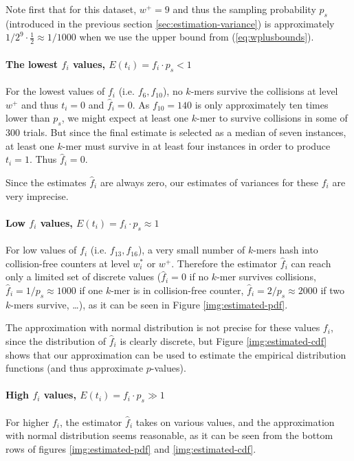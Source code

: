 Note first that for this dataset, $w^+ = 9$ and thus the sampling probability $p_s$
(introduced in the previous section \ref{sec:estimation-variance}) is approximately
$1/2^9 \cdot \frac{1}{2} \approx 1/1000 $ when we use the upper bound from (\ref{eq:wplusbounds}).

\paragraph{The lowest $f_i$ values, $E(t_i) = f_i \cdot p_s < 1$}
For the lowest values of $f_i$ (i.e. $f_6, f_{10}$), 
no $k$-mers survive the collisions at level $w^+$ and thus $t_i = 0$ and $\hat f_i = 0$. 
As $f_{10}=140$ is only approximately ten times lower than $p_s$, we might expect at least
one $k$-mer to survive collisions in some of 300 trials. But since the final estimate is selected
as a median of seven instances, at least one $k$-mer must survive in at least four instances
in order to produce $t_i = 1$. Thus $\hat f_i = 0$. 

Since the estimates $\hat f_i$ are always zero, our estimates of variances for these $f_i$ are 
very imprecise.

\paragraph{Low $f_i$ values, $E(t_i) = f_i \cdot p_s \approx 1$}
For low values of $f_i$ (i.e. $f_{13}, f_{16}$), a very small number of $k$-mers hash
into collision-free counters at level $w_i^*$ or $w^+$. Therefore the
estimator $\hat f_i$ can reach only a limited set of discrete 
values ($\hat f_i=0$ if no $k$-mer survives collisions, $\hat f_i = 1/p_s \approx 1000$
if one $k$-mer is in collision-free counter, $\hat f_i = 2/p_s \approx 2000$ 
if two $k$-mers survive, \dots), as it can be seen in Figure \ref{img:estimated-pdf}.

The approximation with normal distribution is not precise for these values $f_i$, since
the distribution of $\hat f_i$ is clearly discrete, but Figure \ref{img:estimated-cdf} shows
that our approximation can be used to estimate the empirical distribution
functions (and thus approximate $p$-values).

\paragraph{High $f_i$ values, $E(t_i) = f_i \cdot p_s \gg 1$}
For higher $f_i$, the estimator $\hat f_i$ takes on various values, and the approximation with
normal distribution seems reasonable, as it can be seen from the bottom rows of figures 
\ref{img:estimated-pdf} and \ref{img:estimated-cdf}.


